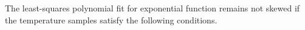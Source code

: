 \begin{lemma}
        \label{lemma::T_suff}
        The least-squares polynomial fit for exponential function remains not skewed if the temperature samples satisfy the following conditions.
\end{lemma}
